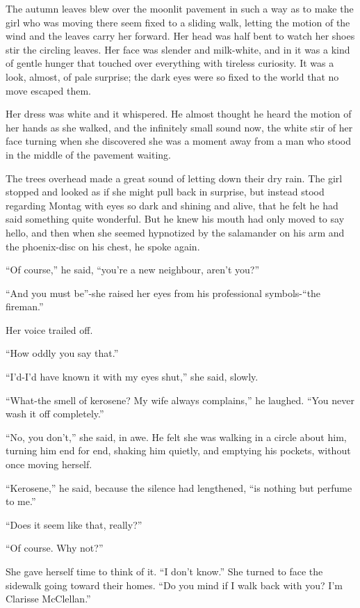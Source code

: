\documentclass[11pt,openany]{book}
\begin{document}
The autumn leaves blew over the moonlit pavement in such a way as to make the girl who was moving there seem fixed to a sliding walk, letting the motion of the wind and the leaves carry her forward. Her head was half bent to watch her shoes stir the circling leaves. Her face was slender and milk-white, and in it was a kind of gentle hunger that touched over everything with tireless curiosity. It was a look, almost, of pale surprise; the dark eyes were so fixed to the world that no move escaped them.

Her dress was white and it whispered. He almost thought he heard the motion of her hands as she walked, and the infinitely small sound now, the white stir of her face turning when she discovered she was a moment away from a man who stood in the middle of the pavement waiting.

The trees overhead made a great sound of letting down their dry rain. The girl stopped and looked as if she might pull back in surprise, but instead stood regarding Montag with eyes so dark and shining and alive, that he felt he had said something quite wonderful. But he knew his mouth had only moved to say hello, and then when she seemed hypnotized by the salamander on his arm and the phoenix-disc on his chest, he spoke again.

``Of course,'' he said, ``you're a new neighbour, aren't you?''

``And you must be''-she raised her eyes from his professional symbols-``the fireman.''

Her voice trailed off.

``How oddly you say that.''

``I'd-I'd have known it with my eyes shut,'' she said, slowly.

``What-the smell of kerosene? My wife always complains,'' he laughed. ``You never wash it off completely.''

``No, you don't,'' she said, in awe. He felt she was walking in a circle about him, turning him end for end, shaking him quietly, and emptying his pockets, without once moving herself.

``Kerosene,'' he said, because the silence had lengthened, ``is nothing but perfume to me.''

``Does it seem like that, really?''

``Of course. Why not?''

She gave herself time to think of it. ``I don't know.'' She turned to face the sidewalk going toward their homes. ``Do you mind if I walk back with you? I'm Clarisse McClellan.''
\end{document}
